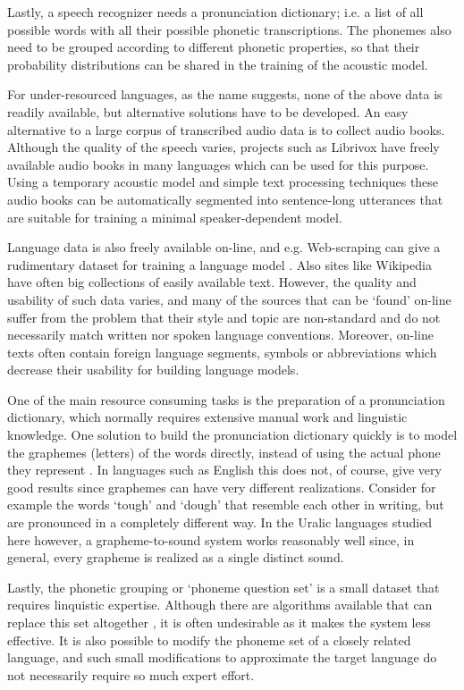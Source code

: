 \documentclass[b5paper]{article}
\begin{document}
Lastly, a speech recognizer needs a pronunciation dictionary; i.e. a list of all possible words with all their possible phonetic transcriptions. The phonemes also need to be grouped according to different phonetic properties, so that their probability distributions can be shared in the training of the acoustic model.

For under-resourced languages, as the name suggests, none of the above data is readily available, but alternative solutions have to be developed. An easy alternative to a large corpus of transcribed audio data is to collect audio books. Although the quality of the speech varies, projects such as Librivox have freely available audio books in many languages which can be used for this purpose. Using a temporary acoustic model and simple text processing techniques these audio books can be automatically segmented into sentence-long utterances that are suitable for training a minimal speaker-dependent model.

Language data is also freely available on-line, and e.g. Web-scraping can give a rudimentary dataset for training a language model \cite{scannell2007crubadan}.  Also sites like Wikipedia have often big collections of easily available text. However, the quality and usability of such data varies, and many of the sources that can be `found' on-line suffer from the problem that their style and topic are non-standard and do not necessarily match written nor spoken language conventions. Moreover, on-line texts often contain foreign language segments, symbols or abbreviations which decrease their usability for building language models.

One of the main resource consuming tasks is the preparation of a pronunciation dictionary, which normally requires extensive manual work and linguistic knowledge. One solution to build the pronunciation dictionary quickly is to model the graphemes (letters) of the words directly, instead of using the actual phone they represent \cite{kanthak2003multilingual}. In languages such as English this does not, of course, give very good results since graphemes can have very different realizations. Consider for example the words `tough' and `dough' that resemble each other in writing, but are pronounced in a completely different way. In the Uralic languages studied here however, a grapheme-to-sound system works reasonably well since, in general, every grapheme is realized as a single distinct sound.

Lastly, the phonetic grouping or `phoneme question set' is a small dataset that requires linquistic expertise. Although there are algorithms available that can replace this set altogether \cite{darjaa2011effective}, it is often undesirable as it makes the system less effective. It is also possible to modify the phoneme set of a closely related language, and such small modifications to approximate the target language do not necessarily require so much expert effort.
\end{document}
